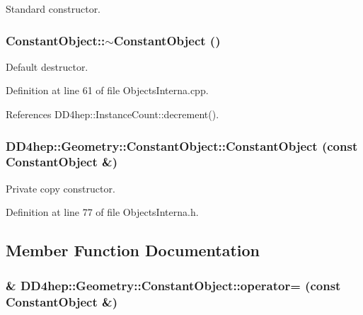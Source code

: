 Standard constructor. \hypertarget{class_d_d4hep_1_1_geometry_1_1_constant_object_af524dd1ddcc810be603b62808042d0cb}{
\subsubsection[{$\sim$ConstantObject}]{\setlength{\rightskip}{0pt plus 5cm}ConstantObject::$\sim$ConstantObject ()}}
\label{class_d_d4hep_1_1_geometry_1_1_constant_object_af524dd1ddcc810be603b62808042d0cb}


Default destructor. 

Definition at line 61 of file ObjectsInterna.cpp.

References DD4hep::InstanceCount::decrement().\hypertarget{class_d_d4hep_1_1_geometry_1_1_constant_object_a9bc01ddd3487fdaf76be43bce415e0e9}{
\subsubsection[{ConstantObject}]{\setlength{\rightskip}{0pt plus 5cm}DD4hep::Geometry::ConstantObject::ConstantObject (const {\bf ConstantObject} \&)}}
\label{class_d_d4hep_1_1_geometry_1_1_constant_object_a9bc01ddd3487fdaf76be43bce415e0e9}


Private copy constructor. 

Definition at line 77 of file ObjectsInterna.h.

\subsection{Member Function Documentation}
\hypertarget{class_d_d4hep_1_1_geometry_1_1_constant_object_acd8082f3aab755887e4bb77f1b730cf3}{
\subsubsection[{operator=}]{\& DD4hep::Geometry::ConstantObject::operator= (const {\bf ConstantObject} \&)}}
\label{class_d_d4hep_1_1_geometry_1_1_constant_object_acd8082f3aab755887e4bb77f1b730cf3}


